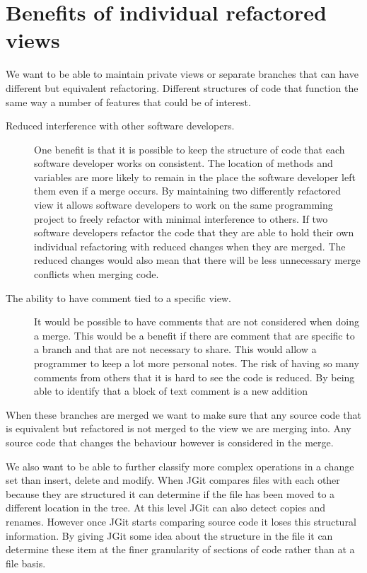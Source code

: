 \section{Benefits of individual refactored views}
We want to be able to maintain private views or separate branches that can have different but equivalent refactoring. Different structures of code that function the same way a number of features that could be of interest.

\begin{description}

  \item [Reduced interference with other software developers.]   
  One benefit is that it is possible to keep the structure of code that each software developer works on consistent.  The location of methods and variables are more likely to remain in the place the software developer left them even if a merge occurs.
  By maintaining two differently refactored view it allows software developers to work on the same programming project to freely refactor with minimal interference to others.
  If two software developers refactor the code that they are able to hold their own individual refactoring with reduced changes when they are merged.
  The reduced changes would also mean that there will be less unnecessary merge conflicts when merging code.
  
  \item [The ability to have comment tied to a specific view.] 
  It would be possible to have comments that are not considered when doing a merge. This would be a benefit if there are comment that are specific to a branch and that are not necessary to share.  This would allow a programmer to keep a lot more personal notes.  The risk of having so many comments from others that it is hard to see the code is reduced. By being able to identify that a block of text comment is a new addition

\end{description}


When these branches are merged we want to make sure that any source code that is equivalent but refactored is not merged to the view we are merging into. Any source code that changes the behaviour however is considered in the merge.

We also want to be able to further classify more complex operations in a change set than insert, delete and modify.  When JGit compares files with each other because they are structured it can determine if the file has been moved to a different location in the tree.  At this level JGit can also detect copies and renames.  However once JGit starts comparing source code it loses this structural information.  By giving JGit some idea about the structure in the file it can determine these item at the finer granularity of sections of code rather than at a file basis.


